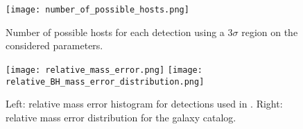 \begin{figure}
    \centering
    \texttt{[image: number\_of\_possible\_hosts.png]}
    \caption[Number of possible hosts]{Number of possible hosts for each detection using a $3\sigma$ region on the considered parameters.}
    \label{fig:possible-hosts}
\end{figure}

\begin{figure}
    \centering
    \texttt{[image: relative\_mass\_error.png]}
    \texttt{[image: relative\_BH\_mass\_error\_distribution.png]}
    \caption[Relative mass error detection and galaxy catalog]{Left: relative mass error histogram for detections used in . Right: relative mass error distribution for the galaxy catalog.}
    \label{fig:relative-mass-error-distribution}
\end{figure}


